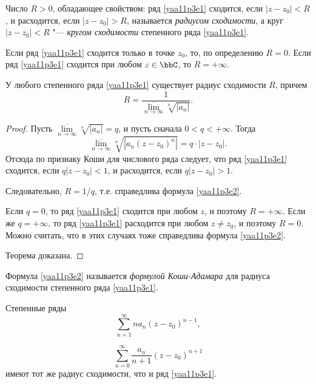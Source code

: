 \begin{defn}
Число $R>0$, обладающее свойством: ряд \eqref{yaa11p3e1} сходится, если $|z-z_0|<R$, и расходится, если $|z-z_0|>R$, называется \textit{радиусом сходимости}, а круг $|z-z_0|<R$ "--- \textit{кругом сходимости} степенного ряда \eqref{yaa11p3e1}.

Если ряд \eqref{yaa11p3e1} сходится только в точке $z_0$, то, по определению $R=0$. Если ряд \eqref{yaa11p3e1} сходится при любом $z\in\bbC$, то $R=+\infty$.
\end{defn}

\begin{thm}
У любого степенного ряда \eqref{yaa11p3e1} существует радиус сходимости $R$, причем
\begin{equation}\label{yaa11p3e2}
R=\frac{1}{\overline{\lim\limits_{n\to\infty}}\sqrt[n]{|a_n|}}.
\end{equation} 
\end{thm}

\begin{proof}
Пусть $\overline{\lim\limits_{n\to\infty}}\sqrt[n]{|a_n|}=q$, и пусть сначала $0<q<+\infty$. Тогда
$$
\overline{\lim\limits_{n\to\infty}}\sqrt[n]{|a_n(z-z_0)^n|}=q\cdot |z-z_0|.
$$
Отсюда по признаку Коши для числового ряда следует, что ряд \eqref{yaa11p3e1} сходится, если $q|z-z_0|<1$, и расходится, если $q|z-z_0|>1$.

Следовательно, $R=1/q$, т.е. справедлива формула \eqref{yaa11p3e2}.

Если $q=0$, то ряд \eqref{yaa11p3e1} сходится при любом $z$, и поэтому $R=+\infty$. Если же $q=+\infty$, то ряд \eqref{yaa11p3e1} расходится при любом $z\ne z_0$, и поэтому $R=0$. Можно считать, что в этих случаях тоже справедлива формула \eqref{yaa11p3e2}. 

Теорема доказана.
\end{proof}

Формула \eqref{yaa11p3e2} называется \textit{формулой Коши-Адамара} для радиуса сходимости степенного ряда \eqref{yaa11p3e1}.

\begin{thm} \label{yaa11p3thm3}
Степенные ряды
\begin{equation}\label{yaa11p3e5}
\sum\limits_{n=1}^{\infty} na_n(z-z_0)^{n-1},
\end{equation}

\begin{equation}\label{yaa11p3e6}
\sum\limits_{n=0}^{\infty}\frac{a_n}{n+1}(z-z_0)^{n+1}
\end{equation}
имеют тот же радиус сходимости, что и ряд \eqref{yaa11p3e1}.
\end{thm}

